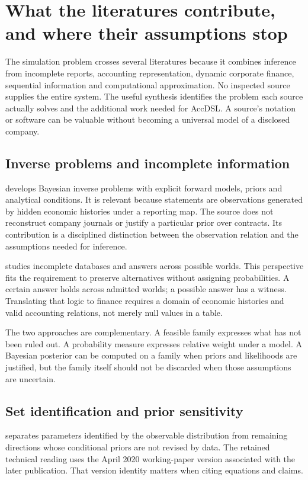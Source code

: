 \chapter[What the literatures contribute]{What the literatures contribute, and where their assumptions stop}
\label{sim:literature-synthesis}

The simulation problem crosses several literatures because it combines inference from incomplete reports, accounting representation, dynamic corporate finance, sequential information and computational approximation. No inspected source supplies the entire system. The useful synthesis identifies the problem each source actually solves and the additional work needed for AccDSL. A source's notation or software can be valuable without becoming a universal model of a disclosed company.

\section{Inverse problems and incomplete information}
\citet{stuart2010} develops Bayesian inverse problems with explicit forward models, priors and analytical conditions. It is relevant because statements are observations generated by hidden economic histories under a reporting map. The source does not reconstruct company journals or justify a particular prior over contracts. Its contribution is a disciplined distinction between the observation relation and the assumptions needed for inference.

\citet{libkin2014,libkin2016certain} studies incomplete databases and answers across possible worlds. This perspective fits the requirement to preserve alternatives without assigning probabilities. A certain answer holds across admitted worlds; a possible answer has a witness. Translating that logic to finance requires a domain of economic histories and valid accounting relations, not merely null values in a table.

The two approaches are complementary. A feasible family expresses what has not been ruled out. A probability measure expresses relative weight under a model. A Bayesian posterior can be computed on a family when priors and likelihoods are justified, but the family itself should not be discarded when those assumptions are uncertain.

\section{Set identification and prior sensitivity}
\citet[Sections 2.1--2.3]{giacomini2021} separates parameters identified by the observable distribution from remaining directions whose conditional priors are not revised by data. The retained technical reading uses the April 2020 working-paper version associated with the later publication. That version identity matters when citing equations and claims.

